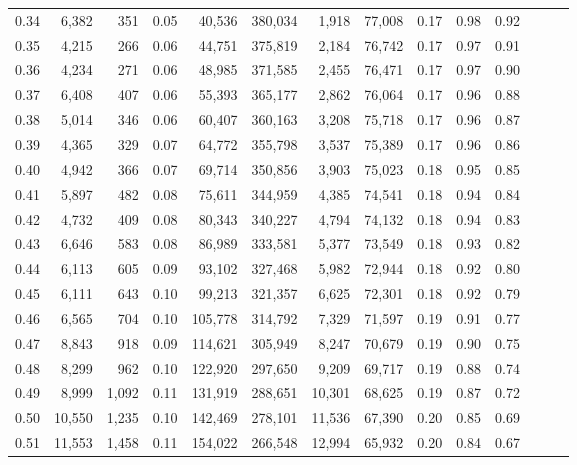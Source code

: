 \begin{tabular}{rrrrrrrrrrrrrr}
0.34 &   6,382 &    351 &  0.05 &   40,536 &  380,034 &   1,918 &  77,008 &  0.17 &  0.98 &      0.92 \\
0.35 &   4,215 &    266 &  0.06 &   44,751 &  375,819 &   2,184 &  76,742 &  0.17 &  0.97 &      0.91 \\
0.36 &   4,234 &    271 &  0.06 &   48,985 &  371,585 &   2,455 &  76,471 &  0.17 &  0.97 &      0.90 \\
0.37 &   6,408 &    407 &  0.06 &   55,393 &  365,177 &   2,862 &  76,064 &  0.17 &  0.96 &      0.88 \\
0.38 &   5,014 &    346 &  0.06 &   60,407 &  360,163 &   3,208 &  75,718 &  0.17 &  0.96 &      0.87 \\
0.39 &   4,365 &    329 &  0.07 &   64,772 &  355,798 &   3,537 &  75,389 &  0.17 &  0.96 &      0.86 \\
0.40 &   4,942 &    366 &  0.07 &   69,714 &  350,856 &   3,903 &  75,023 &  0.18 &  0.95 &      0.85 \\
0.41 &   5,897 &    482 &  0.08 &   75,611 &  344,959 &   4,385 &  74,541 &  0.18 &  0.94 &      0.84 \\
0.42 &   4,732 &    409 &  0.08 &   80,343 &  340,227 &   4,794 &  74,132 &  0.18 &  0.94 &      0.83 \\
0.43 &   6,646 &    583 &  0.08 &   86,989 &  333,581 &   5,377 &  73,549 &  0.18 &  0.93 &      0.82 \\
0.44 &   6,113 &    605 &  0.09 &   93,102 &  327,468 &   5,982 &  72,944 &  0.18 &  0.92 &      0.80 \\
0.45 &   6,111 &    643 &  0.10 &   99,213 &  321,357 &   6,625 &  72,301 &  0.18 &  0.92 &      0.79 \\
0.46 &   6,565 &    704 &  0.10 &  105,778 &  314,792 &   7,329 &  71,597 &  0.19 &  0.91 &      0.77 \\
0.47 &   8,843 &    918 &  0.09 &  114,621 &  305,949 &   8,247 &  70,679 &  0.19 &  0.90 &      0.75 \\
0.48 &   8,299 &    962 &  0.10 &  122,920 &  297,650 &   9,209 &  69,717 &  0.19 &  0.88 &      0.74 \\
0.49 &   8,999 &  1,092 &  0.11 &  131,919 &  288,651 &  10,301 &  68,625 &  0.19 &  0.87 &      0.72 \\
0.50 &  10,550 &  1,235 &  0.10 &  142,469 &  278,101 &  11,536 &  67,390 &  0.20 &  0.85 &      0.69 \\
0.51 &  11,553 &  1,458 &  0.11 &  154,022 &  266,548 &  12,994 &  65,932 &  0.20 &  0.84 &      0.67 \\

\end{tabular}
